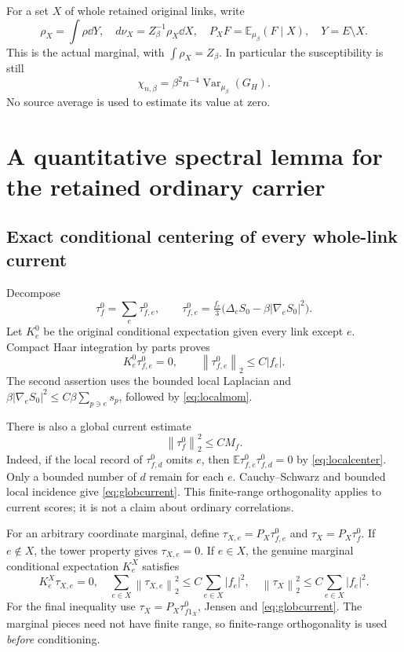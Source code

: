 \documentclass[11pt,letterpaper]{article}
\theoremstyle{remark}\newtheorem{remark}[theorem]{Remark}
\newcommand{\E}{\mathbb E}
\newcommand{\Var}{\operatorname{Var}}\newcommand{\Cov}{\operatorname{Cov}}
\newcommand{\norm}[1]{\left\lVert#1\right\rVert}
\begin{document}
For a set $X$ of whole retained original links, write
\begin{equation}\label{eq:margin}
 \rho_X=\int\rho\dd Y,\quad
 d\nu_X=Z_\beta^{-1}\rho_X\dd X,\quad
 P_XF=\E_{\mu_\beta}(F\mid X),\quad Y=E\setminus X.
\end{equation}
This is the actual marginal, with $\int\rho_X=Z_\beta$. In particular the susceptibility is still
\begin{equation}\label{eq:chi}
 \chi_{n,\beta}=\beta^2n^{-4}\Var_{\mu_\beta}(G_H).
\end{equation}
No source average is used to estimate its value at zero.

\section{A quantitative spectral lemma for the retained ordinary carrier}

\subsection{Exact conditional centering of every whole-link current}

Decompose
\[
 \tau_f^0=\sum_e\tau_{f,e}^0,\qquad
 \tau_{f,e}^0=\tfrac{f_e}{3}
       \bigl(\Delta_eS_0-\beta|\nabla_eS_0|^2\bigr).
\]
Let $K_e^0$ be the original conditional expectation given every link except $e$. Compact Haar integration by parts proves
\begin{equation}\label{eq:localcenter}
 K_e^0\tau_{f,e}^0=0,\qquad
 \norm{\tau_{f,e}^0}_2\le C|f_e|.
\end{equation}
The second assertion uses the bounded local Laplacian and
$\beta|\nabla_eS_0|^2\le C\beta\sum_{p\ni e}s_p$, followed by \eqref{eq:localmom}.

There is also a global current estimate
\begin{equation}\label{eq:globcurrent}
 \norm{\tau_f^0}_2^2\le CM_f.
\end{equation}
Indeed, if the local record of $\tau_{f,d}^0$ omits $e$, then
$\E\tau_{f,e}^0\tau_{f,d}^0=0$ by \eqref{eq:localcenter}. Only a bounded number of $d$ remain for each $e$. Cauchy--Schwarz and bounded local incidence give \eqref{eq:globcurrent}. This finite-range orthogonality applies to current scores; it is not a claim about ordinary correlations.

For an arbitrary coordinate marginal, define
$\tau_{X,e}=P_X\tau_{f,e}^0$ and $\tau_X=P_X\tau_f^0$. If $e\notin X$, the tower property gives $\tau_{X,e}=0$. If $e\in X$, the genuine marginal conditional expectation $K_e^X$ satisfies
\begin{equation}\label{eq:margincenter}
 K_e^X\tau_{X,e}=0,\quad
 \sum_{e\in X}\norm{\tau_{X,e}}_2^2\le C\sum_{e\in X}|f_e|^2,\quad
 \norm{\tau_X}_2^2\le C\sum_{e\in X}|f_e|^2.
\end{equation}
For the final inequality use
$\tau_X=P_X\tau_{f1_X}^0$, Jensen and \eqref{eq:globcurrent}.
The marginal pieces need not have finite range, so finite-range orthogonality is used \emph{before} conditioning.
\end{document}
